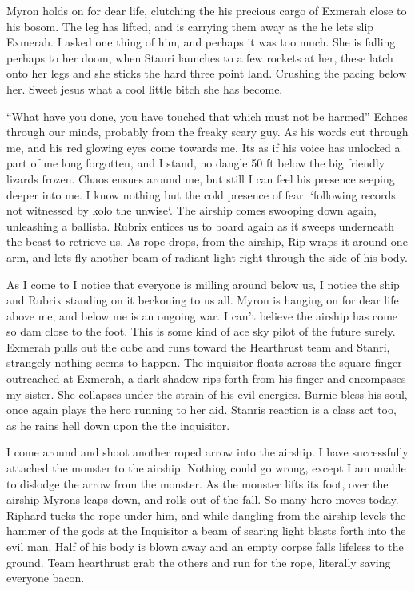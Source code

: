 Myron holds on for dear life, clutching the his precious cargo of Exmerah close to his bosom. The leg has lifted, and is carrying them away as the he lets slip Exmerah. I asked one thing of him, and perhaps it was too much. She is falling perhaps to her doom, when Stanri launches to a few rockets at her, these latch onto her legs and she sticks the hard three point land. Crushing the pacing below her. Sweet jesus what a cool little bitch she has become.\medskip

“What have you done, you have touched that which must not be harmed” Echoes through our minds, probably from the freaky scary guy. As his words cut through me, and his red glowing eyes come towards me. Its as if his voice has unlocked a part of me long forgotten, and I stand, no dangle 50 ft below the big friendly lizards frozen. Chaos ensues around me, but still I can feel his presence seeping deeper into me. I know nothing but the cold presence of fear. `following records not witnessed by kolo the unwise`. The airship comes swooping down again, unleashing a ballista. Rubrix entices us to board again as it sweeps underneath the beast to retrieve us. As rope drops, from the airship, Rip wraps it around one arm, and lets fly another beam of radiant light right through the side of his body.\medskip

As I come to I notice that everyone is milling around below us, I notice the ship and Rubrix standing on it beckoning to us all. Myron is hanging on for dear life above me, and below me is an ongoing war. I can’t believe the airship has come so dam close to the foot. This is some kind of ace sky pilot of the future surely. Exmerah pulls out the cube and runs toward the Hearthrust team and Stanri, strangely nothing seems to happen. The inquisitor floats across the square finger outreached at Exmerah, a dark shadow rips forth from his finger and encompases my sister. She collapses under the strain of his evil energies. Burnie bless his soul, once again plays the hero running to her aid. Stanris reaction is a class act too, as he rains hell down upon the the inquisitor.\medskip

I come around and shoot another roped arrow into the airship. I have successfully attached the monster to the airship. Nothing could go wrong, except I am unable to dislodge the arrow from the monster. As the monster lifts its foot, over the airship Myrons leaps down, and rolls out of the fall. So many hero moves today. Riphard tucks the rope under him, and while dangling from the airship levels the hammer of the gods at the Inquisitor a beam of searing light blasts forth into the evil man. Half of his body is blown away and an empty corpse falls lifeless to the ground. Team hearthrust grab the others and run for the rope, literally saving everyone bacon.\medskip

